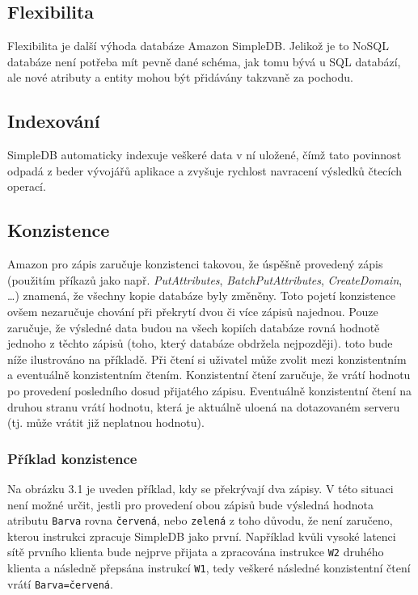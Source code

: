 \documentclass[oneside,11pt]{fithesis2}
\begin{document}
\subsection*{Flexibilita}
Flexibilita je další výhoda databáze Amazon SimpleDB. Jelikož je to NoSQL databáze není potřeba mít pevně dané schéma, jak tomu bývá u SQL databází, ale nové atributy a entity mohou být přidávány takzvaně za pochodu.
\subsection*{Indexování}
SimpleDB automaticky indexuje veškeré data v ní uložené, čímž tato povinnost odpadá z beder vývojářů aplikace a zvyšuje rychlost navracení výsledků čtecích operací.	
\subsection*{Konzistence}
Amazon pro zápis zaručuje konzistenci takovou, že úspěšně provedený zápis (použitím příkazů jako např. \emph{PutAttributes}, \emph{BatchPutAttributes}, \emph{CreateDomain}, \dots) znamená, že všechny kopie databáze byly změněny. Toto pojetí konzistence ovšem nezaručuje chování při překrytí dvou či více zápisů najednou. Pouze zaručuje, že výsledné data budou na všech kopiích databáze rovná hodnotě jednoho z těchto zápisů (toho, který databáze obdržela nejpozději). toto bude níže ilustrováno na příkladě.
Při čtení si uživatel může zvolit mezi konzistentním a eventuálně konzistentním čtením. Konzistentní čtení zaručuje, že vrátí hodnotu po provedení posledního dosud přijatého zápisu. Eventuálně konzistentní čtení na druhou stranu vrátí hodnotu, která je aktuálně uloená na dotazovaném serveru (tj. může vrátit již neplatnou hodnotu).
\subsubsection*{Příklad konzistence}
Na obrázku 3.1 je uveden příklad, kdy se překrývají dva zápisy. V této situaci není možné určit, jestli pro provedení obou zápisů bude výsledná hodnota atributu \verb<Barva< rovna \verb<červená<, nebo \verb<zelená< z toho důvodu, že není zaručeno, kterou instrukci zpracuje SimpleDB jako první. Například kvůli vysoké latenci sítě prvního klienta bude nejprve přijata a zpracována instrukce \verb<W2< druhého klienta a následně přepsána instrukcí \verb<W1<, tedy veškeré následné konzistentní čtení vrátí \verb<Barva=červená<.
\end{document}
